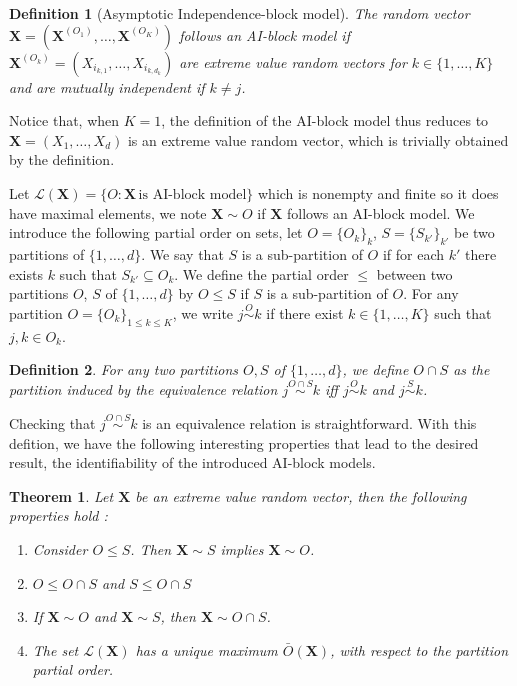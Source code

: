 \documentclass[11pt]{article}
\newtheorem{definition}{Definition}
\newtheorem{theorem}{Theorem}
\begin{document}
	\begin{definition}[Asymptotic Independence-block model]
		 The random vector $\textbf{X} = (\textbf{X}^{(O_1)}, \dots, \textbf{X}^{(O_K)})$ follows an AI-block model if $\textbf{X}^{(O_k)} = (X_{i_{k,1}}, \dots, X_{i_{k,d_k}})$ are extreme value random vectors for $k \in \{1,\dots,K\}$ and are mutually independent if $k \neq j$.
	\end{definition}
	
	Notice that, when $K=1$, the definition of the AI-block model thus reduces to $\textbf{X} = (X_1,\dots,X_d)$ is an extreme value random vector, which is trivially obtained by the definition. 
	
	Let $\mathcal{L}(\textbf{X}) = \{O : \textbf{X} \, \textrm{is AI-block model}\}$ which is nonempty and finite so it does have maximal elements, we note $\textbf{X} \sim O$ if $\textbf{X}$ follows an AI-block model. We introduce the following partial order on sets, let $O = \{O_k\}_k$, $S = \{S_{k'}\}_{k'}$ be two partitions of $\{1,\dots,d\}$. We say that $S$ is a sub-partition of $O$ if for each $k'$ there exists $k$ such that $S_{k'} \subseteq O_k$. We define the partial order $\leq$ between two partitions $O$, $S$ of $\{1,\dots,d\}$ by $O \leq S$ if $S$ is a sub-partition of $O$. For any partition $O = \{O_k\}_{1 \leq k \leq K}$, we write $j \overset{O}{\sim} k$ if there exist $k \in \{1,\dots,K\}$ such that $j,k \in O_k$.
	
	\begin{definition}
		For any two partitions $O, S$ of $\{1,\dots,d\}$, we define $O \cap S$ as the partition induced by the equivalence relation $j \overset{O \cap S}{\sim} k$ iff $j \overset{O}{\sim} k$ and $j \overset{S}{\sim} k$.
	\end{definition}
	Checking that $j \overset{O \cap S}{\sim} k$ is an equivalence relation is straightforward. With this defition, we have the following interesting properties that lead to the desired result, the identifiability of the introduced AI-block models.
	\begin{theorem}
		\label{thm:unicity}
		Let $\textbf{X}$ be an extreme value random vector, then the following properties hold :
		\begin{enumerate}
			\item Consider $O \leq S$. Then $\textbf{X} \sim S$ implies $\textbf{X} \sim O$.
			\item $O \leq O\cap S$ and $S \leq O \cap S$
			\item If $\textbf{X} \sim O$ and $\textbf{X} \sim S$, then  $\textbf{X} \sim O \cap S$.
			\item The set $\mathcal{L}(\textbf{X})$ has a unique maximum $\bar{O}(\textbf{X})$, with respect to the partition partial order.
		\end{enumerate}
	\end{theorem}
	
\end{document}
